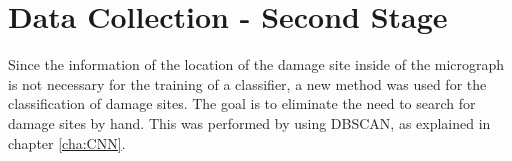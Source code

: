 %
%
%

\section{Data Collection - Second Stage}

Since the information of the location of the damage site inside of the micrograph is not necessary for the training of a classifier, a new method was used for the classification of damage sites. The goal is to eliminate the need to search for damage sites by hand. This was performed by using DBSCAN, as explained in chapter \ref{cha:CNN}. 




